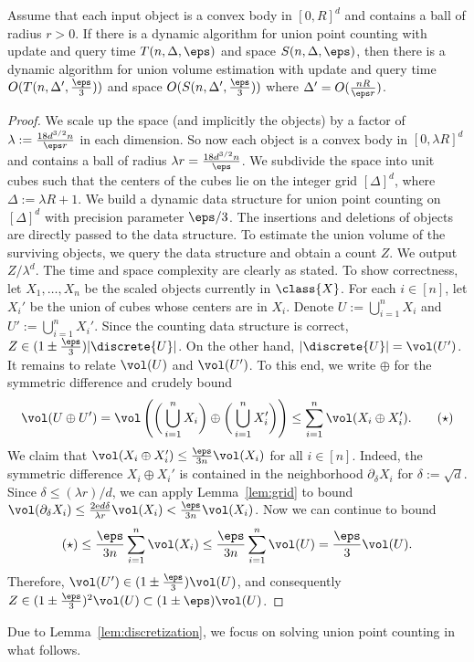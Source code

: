 %
\begin{lemma}
    \label{lem:discretization}
    Assume that each input object is a convex body in $[0,R]^d$ and contains a ball of radius $r>0$. If there is a dynamic algorithm for union point counting with update and query time $T(n,\Delta,\eps)$ and space $S(n,\Delta,\eps)$, then there is a dynamic algorithm for union volume estimation with update and query time $O(T(n, \Delta', \frac{\eps}{3}))$ and space $O(S(n, \Delta', \frac{\eps}{3}))$ where $\Delta' = O(\frac{n R}{\eps r})$.
\end{lemma}
%
\begin{proof}
    We scale up the space (and implicitly the objects) by a factor of $\lambda := \frac{18 d^{3/2} n}{\eps r}$ in each dimension. So now each object is a convex body in $[0, \lambda R]^d$ and contains a ball of radius $\lambda r = \frac{18 d^{3/2} n}{\eps}$. We subdivide the space into unit cubes such that the centers of the cubes lie on the integer grid $[\Delta]^d$, where $\Delta := \lambda R + 1$. We build a dynamic data structure for union point counting on $[\Delta]^d$ with precision parameter $\eps/3$. The insertions and deletions of objects are directly passed to the data structure. To estimate the union volume of the surviving objects, we query the data structure and obtain a count $Z$. We output $Z/\lambda^d$.
%
    The time and space complexity are clearly as stated. To show correctness, let $X_1, \dots, X_n$ be the scaled objects currently in $\class{X}$. For each $i \in [n]$, let $X_i'$ be the union of cubes whose centers are in $X_i$. Denote $U := \bigcup_{i=1}^n X_i$ and $U' := \bigcup_{i=1}^n X_i'$. Since the counting data structure is correct, $Z \in (1\pm\frac{\eps}{3}) |\discrete{U}|$. On the other hand, $|\discrete{U}| = \vol(U')$. It remains to relate $\vol(U)$ and $\vol(U')$. To this end, we write $\oplus$ for the symmetric difference and crudely bound
    \[
        \vol(U \oplus U')
        = \vol \left( \bigg( \bigcup_{i=1}^n X_i \bigg) \oplus \bigg( \bigcup_{i=1}^n X'_i \bigg) \right)
        \leq \sum_{i=1}^n \vol(X_i \oplus X'_i). \tag{$\star$}
    \]
%
    We claim that $\vol(X_i \oplus X_i') \leq \frac{\eps}{3n} \vol(X_i)$ for all $i \in [n]$. Indeed, the symmetric difference $X_i \oplus X_i'$ is contained in the neighborhood $\partial_\delta X_i$ for $\delta := \sqrt{d}$. Since $\delta \leq (\lambda r)/d$, we can apply Lemma~\ref{lem:grid} to bound $\vol(\partial_\delta X_i) \leq \frac{2 \mathrm{e} d \delta}{\lambda r} \vol(X_i) < \frac{\eps}{3n} \vol(X_i)$. Now we can continue to bound
    \[
        (\star)
        \leq \frac{\eps}{3n} \sum_{i=1}^n \vol(X_i)
        \leq \frac{\eps}{3n} \sum_{i=1}^n \vol(U)
        = \frac{\eps}{3} \vol(U).
    \]
    Therefore, $\vol(U') \in (1 \pm \frac{\eps}{3}) \vol(U)$, and consequently $Z \in (1\pm \frac{\eps}{3})^2 \vol(U) \subset (1\pm\eps) \vol(U)$.
\end{proof}
%
Due to Lemma~\ref{lem:discretization}, we focus on solving union point counting in what follows.
%
